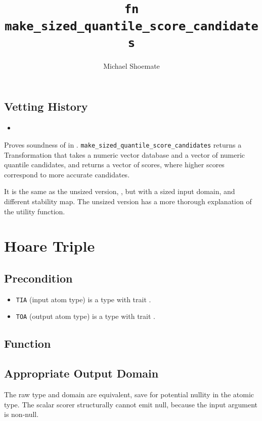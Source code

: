\documentclass{article}
\title{\texttt{fn make\_sized\_quantile\_score\_candidates}}
\author{Michael Shoemate}
\begin{document}
\maketitle  

\contrib

\subsection*{Vetting History}
\begin{itemize}
    \item {}
\end{itemize}

Proves soundness of  
in .
\texttt{make\_sized\_quantile\_score\_candidates} returns a Transformation that 
takes a numeric vector database and a vector of numeric quantile candidates,
and returns a vector of scores, where higher scores correspond to more accurate candidates.

It is the same as the unsized version, , 
but with a sized input domain, and different stability map.
The unsized version has a more thorough explanation of the utility function.

\section{Hoare Triple}
\subsection*{Precondition}
\begin{itemize}
    \item \texttt{TIA} (input atom type) is a type with trait .
    \item \texttt{TOA} (output atom type) is a type with trait .
\end{itemize}


\subsection*{Function}
\label{sec:sized-python-pseudocode}


\subsection{Appropriate Output Domain}
The raw type and domain are equivalent, save for potential nullity in the atomic type. 
The scalar scorer structurally cannot emit null, because the input argument is non-null.
\end{document}
